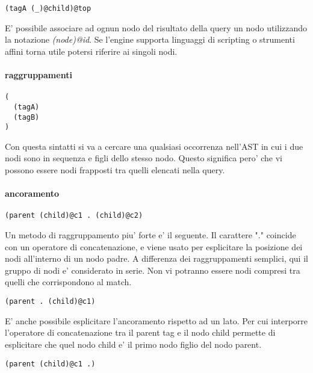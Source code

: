 \begin{Verbatim}[samepage=true]
(tagA (_)@child)@top
\end{Verbatim}

E' possibile associare ad ognun nodo del risultato della query un nodo utilizzando la notazione \emph{(node)@id}.
Se l'engine supporta linguaggi di scripting o strumenti affini torna utile potersi riferire ai singoli nodi.

\paragraph{raggruppamenti}

\begin{Verbatim}[samepage=true]
(
  (tagA)
  (tagB)
)
\end{Verbatim}

Con questa sintatti si va a cercare una qualsiasi occorrenza nell'AST in cui i due nodi sono in sequenza e figli dello stesso nodo.
Questo significa pero' che vi possono essere nodi frapposti tra quelli elencati nella query.

\paragraph{ancoramento}

\begin{Verbatim}[samepage=true]
(parent (child)@c1 . (child)@c2)
\end{Verbatim}

Un metodo di raggruppamento piu' forte e' il seguente.
Il carattere "." coincide con un operatore di concatenazione, e viene usato per esplicitare la posizione dei nodi all'interno di un nodo padre.
A differenza dei raggruppamenti semplici, qui il gruppo di nodi e' considerato in serie.
Non vi potranno essere nodi compresi tra quelli che corrispondono al match.

\begin{Verbatim}[samepage=true]
(parent . (child)@c1)
\end{Verbatim}

E' anche possibile esplicitare l'ancoramento rispetto ad un lato.
Per cui interporre l'operatore di concatenazione tra il parent tag e il nodo child permette di esplicitare che quel nodo child e' il primo nodo figlio del nodo parent.

\begin{Verbatim}[samepage=true]
(parent (child)@c1 .)
\end{Verbatim}

